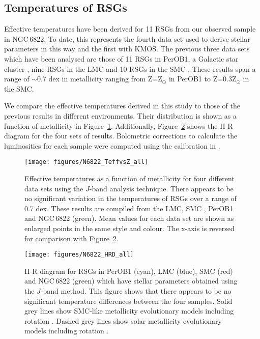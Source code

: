 \documentclass[iop]{emulateapj}
\begin{document}

\subsection{Temperatures of RSGs} %
\label{sub:temperatures_of_rsgs}

Effective temperatures have been derived for 11 RSGs from our observed sample in NGC\,6822.
To date, this represents the fourth data set used to derive stellar parameters in this way and the first with KMOS.
The previous three data sets which have been analysed are those of 11 RSGs in PerOB1,
a Galactic star cluster
\citep{2014ApJ...788...58G}, nine RSGs in the LMC and 10 RSGs in the SMC
\citep[both from][]{Davies-prep}.
These results span a range of $\sim$0.7 dex in metallicity ranging from Z=Z$_{\odot}$ in PerOB1 to Z=0.3Z$_{\odot}$ in the SMC.

We compare the effective temperatures derived in this study to those of the previous results in different environments.
Their distribution is shown as a function of metallicity in Figure~\ref{fig:TvsZ}.
Additionally, Figure~\ref{fig:HRD} shows the H-R diagram for the four sets of results.
Bolometric corrections to calculate the luminosities for each sample were computed using the calibration in
\cite{2013ApJ...767....3D}.


\begin{figure}
\texttt{[image: figures/N6822\_TeffvsZ\_all]}
\caption{
Effective temperatures as a function of metallicity for four different data sets using the $J$-band analysis technique.
There appears to be no significant variation in the temperatures of RSGs over a range of 0.7 dex.
These results are compiled from the LMC, SMC
\protect\citep[blue and red points respectively;][]{Davies-prep}, PerOB1
\protect\citep[a Galactic RSG cluster; cyan;][]{2014ApJ...788...58G} and NGC\,6822 (green).
Mean values for each data set are shown as enlarged points in the same style and colour.
The x-axis is reversed for comparison with Figure~\ref{fig:HRD}.\label{fig:TvsZ}
         }
\end{figure}

\begin{figure}
\texttt{[image: figures/N6822\_HRD\_all]}
\caption{
H-R diagram for RSGs in PerOB1 (cyan), LMC (blue), SMC (red) and NGC\,6822 (green) which have stellar parameters obtained using the $J$-band method.
This figure shows that there appears to be no significant temperature differences between the four samples.
Solid grey lines show SMC-like metallicity evolutionary models including rotation
\protect\citep{2013A&A...558A.103G}.
Dashed grey lines show solar metallicity evolutionary models including rotation
\protect\citep{2012A&A...537A.146E}.\label{fig:HRD}
        }
\end{figure}
\end{document}
